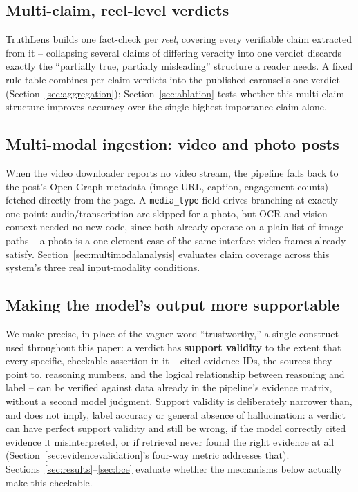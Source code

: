 \documentclass[conference]{IEEEtran}
\begin{document}
\subsection{Multi-claim, reel-level verdicts}
TruthLens builds one fact-check per \emph{reel}, covering every verifiable
claim extracted from it -- collapsing several claims of differing
veracity into one verdict discards exactly the ``partially true,
partially misleading'' structure a reader needs. A fixed rule table
combines per-claim verdicts into the published carousel's one verdict
(Section~\ref{sec:aggregation}); Section~\ref{sec:ablation} tests whether
this multi-claim structure improves accuracy over the single
highest-importance claim alone.

\subsection{Multi-modal ingestion: video and photo posts}
\label{sec:multimodal}
When the video downloader reports no video stream, the pipeline falls
back to the post's Open Graph metadata (image URL, caption, engagement
counts) fetched directly from the page. A \texttt{media\_type} field
drives branching at exactly one point: audio/transcription are skipped
for a photo, but OCR and vision-context needed no new code, since both
already operate on a plain list of image paths -- a photo is a
one-element case of the same interface video frames already satisfy.
Section~\ref{sec:multimodalanalysis} evaluates claim coverage across this
system's three real input-modality conditions.

\subsection{Making the model's output more supportable}
\label{sec:methodology}
We make precise, in place of the vaguer word ``trustworthy,'' a single
construct used throughout this paper: a verdict has \textbf{support
validity} to the extent that every specific, checkable assertion in it --
cited evidence IDs, the sources they point to, reasoning numbers, and the
logical relationship between reasoning and label -- can be verified
against data already in the pipeline's evidence matrix, without a second
model judgment. Support validity is deliberately narrower than, and does
not imply, label accuracy or general absence of hallucination: a verdict
can have perfect support validity and still be wrong, if the model
correctly cited evidence it misinterpreted, or if retrieval never found
the right evidence at all (Section~\ref{sec:evidencevalidation}'s
four-way metric addresses that). Sections~\ref{sec:results}--\ref{sec:bce}
evaluate whether the mechanisms below actually make this checkable.
\end{document}
